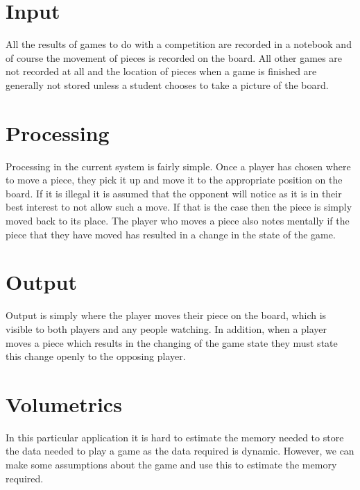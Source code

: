 \section{Input}
All the results of games to do with a competition are recorded in a notebook and of course the movement of pieces is recorded on the board. All other games are not recorded at all and the location of pieces when a game is finished are generally not stored unless a student chooses to take a picture of the board.
\section{Processing}
Processing in the current system is fairly simple. Once a player has chosen where to move a piece, they pick it up and move it to the appropriate position on the board. If it is illegal it is assumed that the opponent will notice as it is in their best interest to not allow such a move. If that is the case then the piece is simply moved back to its place. The player who moves a piece also notes mentally if the piece that they have moved has resulted in a change in the state of the game.
\section{Output}
Output is simply where the player moves their piece on the board, which is visible to both players and any people watching. In addition, when a player moves a piece which results in the changing of the game state they must state this change openly to the opposing player.
\section{Volumetrics}
In this particular application it is hard to estimate the memory needed to store the data needed to play a game as the data required is dynamic. However, we can make some assumptions about the game and use this to estimate the memory required. 

